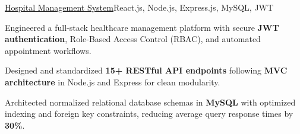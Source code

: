 \begin{cvproject}{\uline{Hospital Management System}}{React.js, Node.js, Express.js, MySQL, JWT}
    \item Engineered a full-stack healthcare management platform with secure \textbf{JWT authentication}, Role-Based Access Control (RBAC), and automated appointment workflows.
    \item Designed and standardized \textbf{15+ RESTful API endpoints} following \textbf{MVC architecture} in Node.js and Express for clean modularity.
    \item Architected normalized relational database schemas in \textbf{MySQL} with optimized indexing and foreign key constraints, reducing average query response times by \textbf{30\%}.
\end{cvproject}
